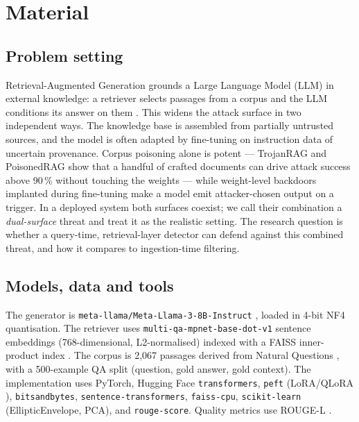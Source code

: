\documentclass[9pt,a4paper,twoside]{rho-class/rho}
\title{\OTHtitle}
\author[1]{\OTHauthor, \OTHmail}
\affil[1]{OTH Amberg-Weiden, Study programme "\OTHstudyprogramme"}
\begin{document}
	\maketitle


\section{Material}

\subsection{Problem setting}

Retrieval-Augmented Generation grounds a Large Language Model (LLM) in external knowledge: a retriever selects passages from a corpus and the LLM conditions its answer on them \cite{lewis2020rag}. This widens the attack surface in two independent ways. The knowledge base is assembled from partially untrusted sources, and the model is often adapted by fine-tuning on instruction data of uncertain provenance. Corpus poisoning alone is potent --- TrojanRAG \cite{cheng2024trojanrag} and PoisonedRAG \cite{zou2024poisonedrag} show that a handful of crafted documents can drive attack success above 90\,\% without touching the weights --- while weight-level backdoors implanted during fine-tuning \cite{gu2017badnets,wan2023poisoning} make a model emit attacker-chosen output on a trigger. In a deployed system both surfaces coexist; we call their combination a \emph{dual-surface} threat and treat it as the realistic setting. The research question is whether a query-time, retrieval-layer detector can defend against this combined threat, and how it compares to ingestion-time filtering.

\subsection{Models, data and tools}

The generator is \texttt{meta-llama/Meta-Llama-3-8B-Instruct} \cite{grattafiori2024llama3}, loaded in 4-bit NF4 quantisation. The retriever uses \texttt{multi-qa-mpnet-base-dot-v1} sentence embeddings \cite{reimers2019sbert,song2020mpnet} (768-dimensional, L2-normalised) indexed with a FAISS inner-product index \cite{johnson2019faiss}. The corpus is 2{,}067 passages derived from Natural Questions \cite{kwiatkowski2019nq}, with a 500-example QA split (question, gold answer, gold context). The implementation uses PyTorch, Hugging Face \texttt{transformers}, \texttt{peft} (LoRA/QLoRA \cite{hu2022lora,dettmers2023qlora}), \texttt{bitsandbytes}, \texttt{sentence-transformers}, \texttt{faiss-cpu}, \texttt{scikit-learn} (EllipticEnvelope, PCA), and \texttt{rouge-score}. Quality metrics use ROUGE-L \cite{lin2004rouge}.
\end{document}
